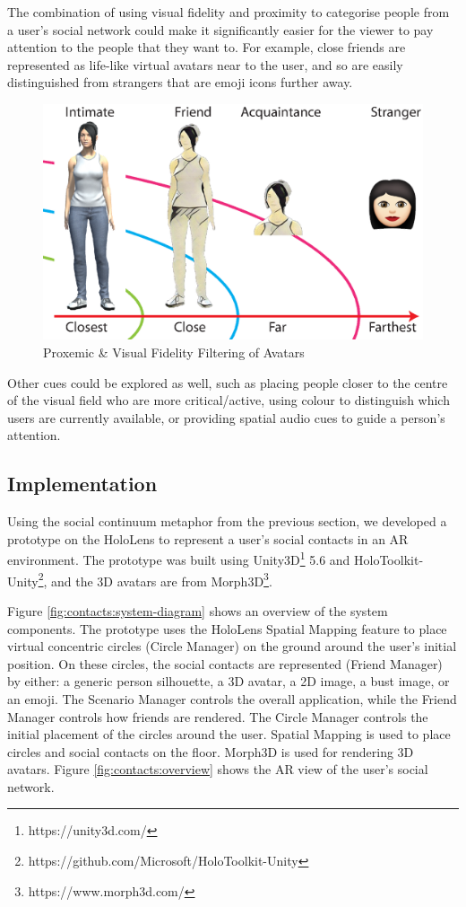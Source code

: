 The combination of using visual fidelity and proximity to categorise people from a user's social network could make it significantly easier for the viewer to pay attention to the people that they want to. For example, close friends are represented as life-like virtual avatars near to the user, and so are easily distinguished from strangers that are emoji icons further away.

\begin{figure}[ht]
  \centering
  \includegraphics[width=.8\linewidth]{images/mgia17/writing-images-11.eps}
  \caption{Proxemic \& Visual Fidelity Filtering of Avatars}
    \label{fig:contacts:proximic-circles}
\end{figure}

Other cues could be explored as well, such as placing people closer to the centre of the visual field who are more critical/active, using colour to distinguish which users are currently available, or providing spatial audio cues to guide a person's attention.


\subsection{Implementation}

Using the social continuum metaphor from the previous section, we developed a prototype on the HoloLens to represent a user's social contacts in an AR environment. The prototype was built using Unity3D\footnote{https://unity3d.com/} 5.6 and HoloToolkit-Unity\footnote{https://github.com/Microsoft/HoloToolkit-Unity}, and the 3D avatars are from Morph3D\footnote{https://www.morph3d.com/}. 

Figure \ref{fig:contacts:system-diagram} shows an overview of the system components. The prototype uses the HoloLens Spatial Mapping feature to place virtual concentric circles (Circle Manager) on the ground around the user's initial position. On these circles, the social contacts are represented (Friend Manager) by either: a generic person silhouette, a 3D avatar, a 2D image, a bust image, or an emoji. The Scenario Manager controls the overall application, while the Friend Manager controls how friends are rendered. The Circle Manager controls the initial placement of the circles around the user. Spatial Mapping is used to place circles and social contacts on the floor. Morph3D is used for rendering 3D avatars. Figure \ref{fig:contacts:overview} shows the AR view of the user's social network.


